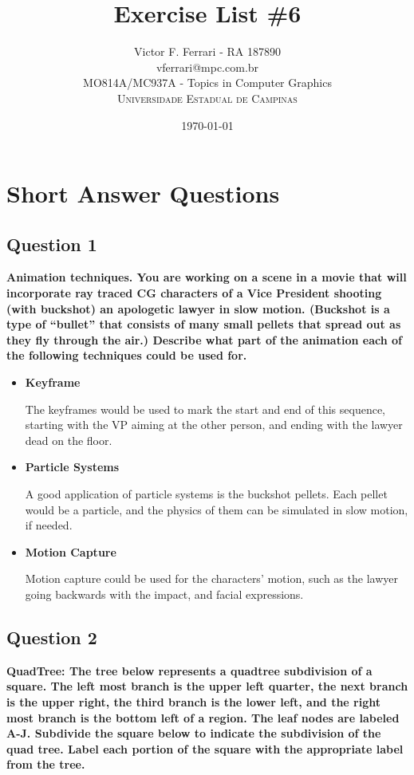 \documentclass[12pt]{article}
\title{Exercise List \#6} %
\author{Victor F. Ferrari - RA 187890\\ %
vferrari@mpc.com.br\\
MO814A/MC937A - Topics in Computer Graphics\\ %
\textsc{Universidade Estadual de Campinas}
}
\date{\today} %
\begin{document}
\setlength{\droptitle}{-5em}    
\maketitle


\section{Short Answer Questions}

\subsection*{Question 1}
{\bfseries Animation techniques. You are working on a scene in a movie that will incorporate ray traced CG characters of a Vice President shooting (with buckshot) an apologetic lawyer in slow motion. (Buckshot is a type of “bullet” that consists of many small pellets that spread out as they fly through the air.) Describe what part of the animation each of the following techniques could be used for.}
\begin{itemize}
    \item \textbf{Keyframe}
    
    The keyframes would be used to mark the start and end of this sequence, starting with the VP aiming at the other person, and ending with the lawyer dead on the floor.
    
    \item \textbf{Particle Systems}
    
    A good application of particle systems is the buckshot pellets. Each pellet would be a particle, and the physics of them can be simulated in slow motion, if needed.
    
    \item \textbf{Motion Capture}
    
    Motion capture could be used for the characters' motion, such as the lawyer going backwards with the impact, and facial expressions.
\end{itemize}

\subsection*{Question 2}
{\bfseries QuadTree: The tree below represents a quadtree subdivision of a square. The left most branch is the upper left quarter, the next branch is the upper right, the third branch is the lower left, and the right most branch is the bottom left of a region. The leaf nodes are labeled A-J. Subdivide the square below to indicate the subdivision of the quad tree. Label each portion of the square with the appropriate label from the tree.}
\end{document}
